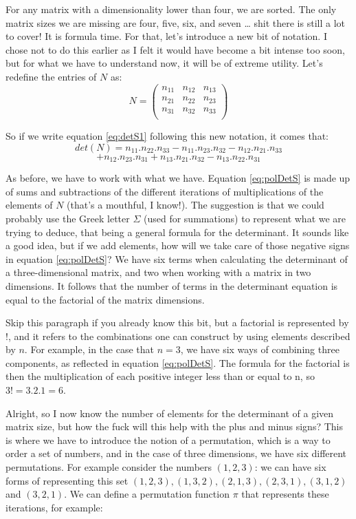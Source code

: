 \documentclass[a4,12pt,twosided,openany]{memoir}
\begin{document}
\indent
For any matrix with a dimensionality lower than four, we are sorted. The only matrix sizes we are missing are four, five, six, and seven … shit there is still a lot to cover! It is formula time. For that, let’s introduce a new bit of notation. I chose not to do this earlier as I felt it would have become a bit intense too soon, but for what we have to understand now, it will be of extreme utility. Let’s redefine the entries of $N$ as:
\[N = \begin{pmatrix}
n_{11} & n_{12} & n_{13}   \\
n_{21} & n_{22} & n_{23} \\
n_{31} & n_{32} & n_{33} \\
\end{pmatrix}\]
\par 
\indent
So if we write equation \ref{eq:detS1} following this new notation, it comes that:
\begin{equation}\label{eq:polDetS}
det(N) = n_{11}.n_{22}.n_{33} - n_{11}.n_{23}.n_{32} - n_{12}.n_{21}.n_{33}      
\end{equation}
\[+ n_{12}.n_{23}.n_{31} + n_{13}.n_{21}.n_{32} - n_{13}.n_{22}.n_{31} \]
\par 
\indent
As before, we have to work with what we have. Equation \ref{eq:polDetS} is made up of sums and subtractions of the different iterations of multiplications of the elements of $N$ (that’s a mouthful, I know!). The suggestion is that we could probably use the Greek letter $\Sigma$ (used for summations) to represent what we are trying to deduce, that being a general formula for the determinant. It sounds like a good idea, but if we add elements, how will we take care of those negative signs in equation \ref{eq:polDetS}? We have six terms when calculating the determinant of a three-dimensional matrix, and two when working with a matrix in two dimensions. It follows that the number of terms in the determinant equation is equal to the factorial of the matrix dimensions.
\par 
\indent
Skip this paragraph if you already know this bit, but a factorial is represented by $!$, and it refers to the combinations one can construct by using elements described by $n$. For example, in the case that $n=3$, we have six ways of combining three components, as reflected in equation \ref{eq:polDetS}. The formula for the factorial is then the multiplication of each positive integer less than or equal to n, so $3!=3.2.1=6$.
\par 
\indent
Alright, so I now know the number of elements for the determinant of a given matrix size, but how the fuck will this help with the plus and minus signs? This is where we have to introduce the notion of a permutation, which is a way to order a set of numbers, and in the case of three dimensions, we have six different permutations. For example consider the numbers $(1,2,3)$: we can have six forms of representing this set $(1,2,3),(1,3,2),(2,1,3),(2,3,1), (3,1,2)$ and $(3,2,1)$. We can define a permutation function $\pi$ that represents these iterations, for example:
\end{document}

